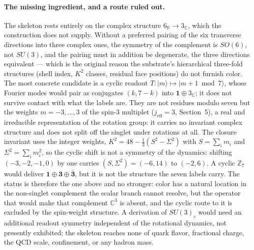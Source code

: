 \documentclass[11pt]{article}
\begin{document}
\paragraph{The missing ingredient, and a route ruled out.}
The skeleton rests entirely on the complex structure $6_{\mathbb R}\to3_{\mathbb C}$, which the construction does not supply. Without a preferred pairing of the six transverse directions into three complex ones, the symmetry of the complement is $SO(6)$, not $SU(3)$, and the pairing must in addition be degenerate, the three directions equivalent --- which is the original reason the substrate's hierarchical three-fold structures (shell index, $K^2$ classes, residual face positions) do not furnish color. The most concrete candidate is a cyclic readout $T:|m\rangle\mapsto|m{+}1 \bmod 7\rangle$, whose Fourier modes would pair as conjugates $(k,7{-}k)$ into $\mathbf1\oplus3_{\mathbb C}$; it does not survive contact with what the labels are. They are not residues modulo seven but the weights $m=-3,\dots,3$ of the spin-$3$ multiplet ($j_{\mathrm{eff}}=3$, Section~5), a real and irreducible representation of the rotation group: it carries no invariant complex structure and does not split off the singlet under rotations at all. The closure invariant uses the integer weights, $K^2=48-\tfrac13(S^2-\Sigma^2)$ with $S=\sum_i m_i$ and $\Sigma^2=\sum_i m_i^2$, so the cyclic shift is not a symmetry of the dynamics: shifting $(-3,-2,-1,0)$ by one carries $(S,\Sigma^2)=(-6,14)$ to $(-2,6)$. A cyclic $\mathbb Z_7$ would deliver $\mathbf1\oplus\mathbf3\oplus\bar{\mathbf3}$, but it is not the structure the seven labels carry. The status is therefore the one above and no stronger: color has a natural location in the non-singlet complement the scalar branch cannot resolve, but the operator that would make that complement $\mathbb C^3$ is absent, and the cyclic route to it is excluded by the spin-weight structure. A derivation of $SU(3)_c$ would need an additional readout symmetry independent of the rotational dynamics, not presently exhibited; the skeleton reaches none of quark flavor, fractional charge, the QCD scale, confinement, or any hadron mass.
\end{document}

